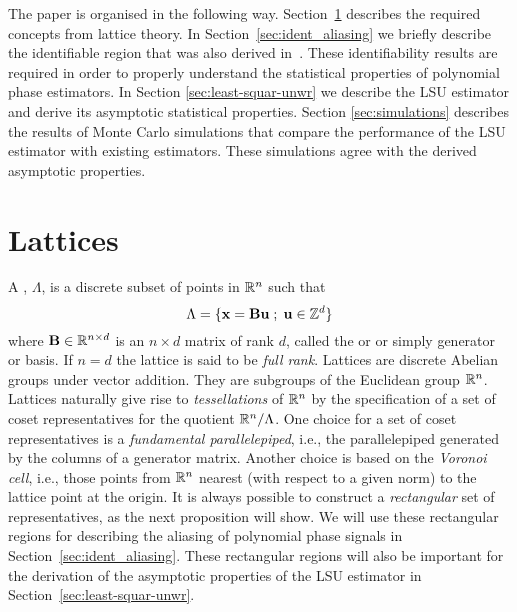 \documentclass[journal]{IEEEtran}
\begin{document}
The paper is organised in the following way. Section~\ref{sec:lattice-theory} describes the required concepts from lattice theory.  In Section~\ref{sec:ident_aliasing} we briefly describe the identifiable region that was also derived in~\cite{McKilliam2009IndentifiabliltyAliasingPolyphase}.  These identifiability results are required in order to properly understand the statistical properties of polynomial phase estimators. In Section \ref{sec:least-squar-unwr} we describe the LSU estimator and derive its asymptotic statistical properties.
Section \ref{sec:simulations} describes the results of Monte Carlo simulations that compare the performance of the LSU estimator with existing estimators.  These simulations agree with the derived asymptotic properties. 



\section{Lattices}\label{sec:lattice-theory}

A ,  $\Lambda$, is a discrete subset of points in ${\mathbb R}^n$ such that
\[
   \Lambda = \{\mathbf{x} = \mathbf{B}\mathbf{u} \; ; \; \mathbf{u} \in {\mathbb Z}^d \}
\]
where $\mathbf{B} \in {\mathbb R}^{n \times d}$ is an $n \times d$ matrix of rank $d$, called the  or  or simply generator or basis.  If $n = d$ the lattice is said to be \emph{full rank}.  Lattices are discrete Abelian groups under vector addition.  They are subgroups of the Euclidean group ${\mathbb R}^n$.  Lattices naturally give rise to \emph{tessellations} of ${\mathbb R}^n$ by the specification of a set of coset representatives for the quotient ${\mathbb R}^n / \Lambda$.  One choice for a set of coset representatives is a \emph{fundamental parallelepiped}, i.e., the parallelepiped generated by the columns of a generator matrix.  Another choice is based on the \emph{Voronoi cell}, i.e., those points from ${\mathbb R}^n$ nearest (with respect to a given norm) to the lattice point at the origin.  It is always possible to construct a \emph{rectangular} set of representatives, as the next proposition will show.  We will use these rectangular regions for describing the aliasing of polynomial phase signals in Section~\ref{sec:ident_aliasing}.  These rectangular regions will also be important for the derivation of the asymptotic properties of the LSU estimator in Section~\ref{sec:least-squar-unwr}.
\end{document}
